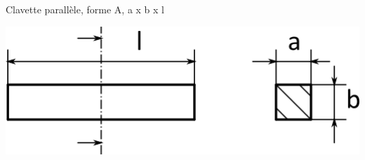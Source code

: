 \documentclass[11pt,oneside]{article}
\begin{document}
\noindent\begin{minipage}[c]{.4\linewidth}
\begin{center}
Clavette parallèle, forme A, a x b x l
\end{center}

\end{minipage}\hfill
\begin{minipage}[c]{.4\linewidth}
\begin{center}
\includegraphics[width=.9\textwidth]{png/clavette}
\end{center}
\end{minipage}
\end{document}
